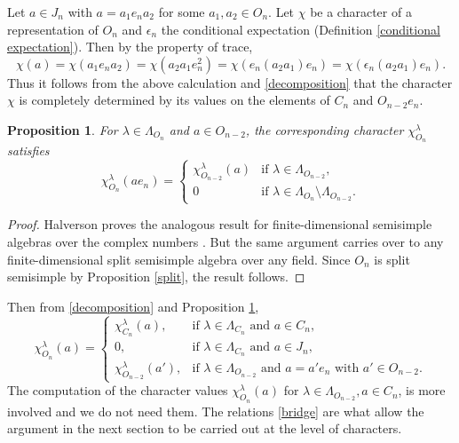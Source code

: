 \documentclass[12pt,reqno]{amsart}
\numberwithin{equation}{section}
\newtheorem{proposition}[theorem]{Proposition}
\theoremstyle{definition}
\theoremstyle{definition}
\begin{document}
Let $a \in J_n$ with $a= a_1e_na_2$ for some $a_1,a_2 \in O_n$. Let $\chi$ be a character of a representation of $O_n$ and $\epsilon_n$ the conditional expectation (Definition \ref{conditional expectation}). Then by the property of trace, 
\[
\chi(a)= \chi(a_1e_na_2)=\chi(a_2a_1e_n^2)=\chi(e_n(a_2a_1)e_n)=\chi(\epsilon_n(a_2a_1)e_n).
\]
Thus it follows from the above calculation and \eqref{decomposition} that the character $\chi$ is completely determined by its values on the elements of $C_n$ and $O_{n-2}e_n$.
\begin{proposition}\label{char}
    For $\lambda \in \Lambda_{O_n}$ and $a \in O_{n-2}$, the corresponding character $\chi_{O_n}^\lambda$ satisfies
\begin{equation}
    \chi_{O_n}^\lambda(ae_n) = \begin{cases}
    \chi_{O_{n-2}}^\lambda(a) & \text{if } \lambda \in \Lambda_{O_{n-2}}, \\
    0 & \text{if } \lambda \in \Lambda_{O_n} \setminus \Lambda_{O_{n-2}}. 
    \end{cases}
\end{equation}
\end{proposition}
\begin{proof}
   Halverson proves the analogous result for finite-dimensional semisimple algebras over the complex numbers \cite[Proposition 5.1.9]{HalversonPartition}. But the same argument carries over to any finite-dimensional split semisimple algebra over any field. Since $O_n$ is split semisimple by Proposition \ref{split}, the result follows. 
\end{proof}
 
 Then from \eqref{decomposition} and Proposition \ref{char},
\begin{equation}\label{bridge}
\chi_{O_n}^\lambda(a)=
\begin{cases}
\chi_{C_n}^\lambda(a), & \text{if $\lambda \in \Lambda_{C_n}$ and $a\in C_n$},\\
0, & \text{if $\lambda \in \Lambda_{C_n}$ and $a\in J_n$},\\
\chi_{O_{n-2}}^\lambda(a'), & \text{if $\lambda \in \Lambda_{O_{n-2}}$ and $a=a'e_n$ with $a'\in O_{n-2}$}.
\end{cases}
\end{equation}
The computation of the character values $\chi_{O_n}^\lambda(a)$ for $\lambda \in \Lambda_{O_{n-2}}, a \in C_n$, is more involved and we do not need them. The relations \eqref{bridge} are what allow the argument in the next section to be carried out at the level of characters.
\end{document}
